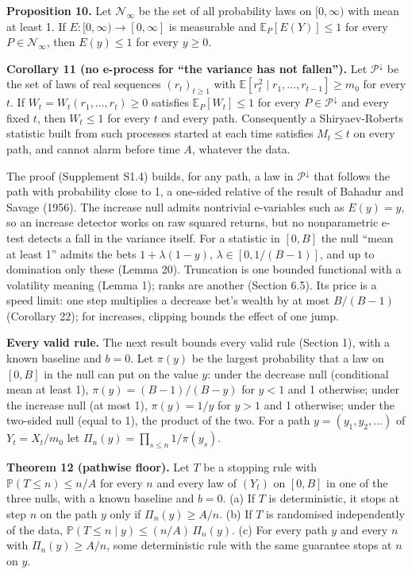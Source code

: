 \documentclass[
]{article}
\begin{document}
\textbf{Proposition 10.} Let \(\mathcal{N}_\infty\) be the set of all
probability laws on \([0, \infty)\) with mean at least 1. If
\(E: [0, \infty) \to [0, \infty]\) is measurable and
\(\mathbb{E}_P[E(Y)] \le 1\) for every \(P \in \mathcal{N}_\infty\),
then \(E(y) \le 1\) for every \(y \ge 0\).

\textbf{Corollary 11 (no e-process for ``the variance has not
fallen'').} Let \(\mathcal{P}^{\downarrow}\) be the set of laws of real
sequences \((r_t)_{t \ge 1}\) with
\(\mathbb{E}[r_t^2 \mid r_1, \dots, r_{t-1}] \ge m_0\) for every \(t\).
If \(W_t = W_t(r_1, \dots, r_t) \ge 0\) satisfies
\(\mathbb{E}_P[W_t] \le 1\) for every \(P \in \mathcal{P}^{\downarrow}\)
and every fixed \(t\), then \(W_t \le 1\) for every \(t\) and every
path. Consequently a Shiryaev-Roberts statistic built from such
processes started at each time satisfies \(M_t \le t\) on every path,
and cannot alarm before time \(A\), whatever the data.

The proof (Supplement S1.4) builds, for any path, a law in
\(\mathcal{P}^{\downarrow}\) that follows the path with probability
close to 1, a one-sided relative of the result of Bahadur and Savage
(1956). The increase null admits nontrivial e-variables such as
\(E(y) = y\), so an increase detector works on raw squared returns, but
no nonparametric e-test detects a fall in the variance itself. For a
statistic in \([0, B]\) the null ``mean at least 1'' admits the bets
\(1 + \lambda(1 - y)\), \(\lambda \in [0, 1/(B-1)]\), and up to
domination only these (Lemma 20). Truncation is one bounded functional
with a volatility meaning (Lemma 1); ranks are another (Section 6.5).
Its price is a speed limit: one step multiplies a decrease bet's wealth
by at most \(B/(B-1)\) (Corollary 22); for increases, clipping bounds
the effect of one jump.

\textbf{Every valid rule.} The next result bounds every valid rule
(Section 1), with a known baseline and \(b = 0\). Let \(\pi(y)\) be the
largest probability that a law on \([0, B]\) in the null can put on the
value \(y\): under the decrease null (conditional mean at least 1),
\(\pi(y) = (B-1)/(B-y)\) for \(y < 1\) and 1 otherwise; under the
increase null (at most 1), \(\pi(y) = 1/y\) for \(y > 1\) and 1
otherwise; under the two-sided null (equal to 1), the product of the
two. For a path \(y = (y_1, y_2, \dots)\) of \(Y_t = X_t/m_0\) let
\(\Pi_n(y) = \prod_{s \le n} 1/\pi(y_s)\).

\textbf{Theorem 12 (pathwise floor).} Let \(T\) be a stopping rule with
\(\mathbb{P}(T \le n) \le n/A\) for every \(n\) and every law of
\((Y_t)\) on \([0, B]\) in one of the three nulls, with a known baseline
and \(b = 0\). (a) If \(T\) is deterministic, it stops at step \(n\) on
the path \(y\) only if \(\Pi_n(y) \ge A/n\). (b) If \(T\) is randomised
independently of the data,
\(\mathbb{P}(T \le n \mid y) \le (n/A)\,\Pi_n(y)\). (c) For every path
\(y\) and every \(n\) with \(\Pi_n(y) \ge A/n\), some deterministic rule
with the same guarantee stops at \(n\) on \(y\).
\end{document}
